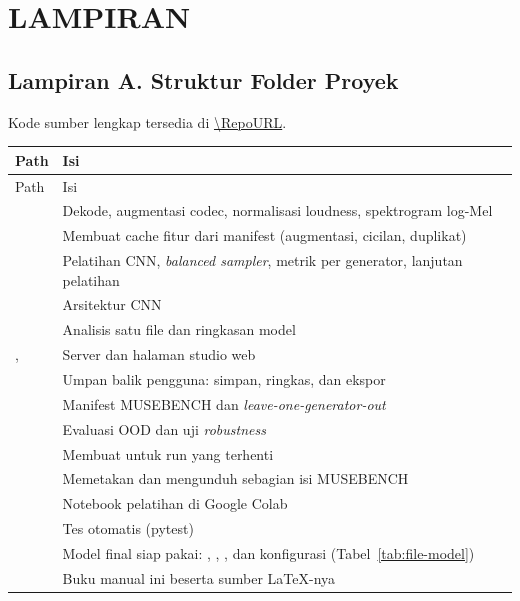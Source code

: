 \chapter*{LAMPIRAN}

\section*{Lampiran A. Struktur Folder Proyek}
Kode sumber lengkap tersedia di \url{\RepoURL}.

{\singlespacing\small
\begin{longtable}{L{5.3cm} L{7.0cm}}
\toprule
Path & Isi\\
\midrule
\endfirsthead
\toprule
Path & Isi\\
\midrule
\endhead
\bottomrule
\endfoot
{} & Dekode, augmentasi codec, normalisasi loudness, spektrogram log-Mel\\
 & Membuat cache fitur dari manifest (augmentasi, cicilan, duplikat)\\
 & Pelatihan CNN, \textit{balanced sampler}, metrik per generator, lanjutan pelatihan\\
 & Arsitektur CNN\\
 & Analisis satu file dan ringkasan model\\
,\newline {} & Server dan halaman studio web\\
 & Umpan balik pengguna: simpan, ringkas, dan ekspor\\
 & Manifest MUSEBENCH dan \textit{leave-one-generator-out}\\
 & Evaluasi OOD dan uji \textit{robustness}\\
 & Membuat  untuk run yang terhenti\\
 & Memetakan dan mengunduh sebagian isi MUSEBENCH\\
 & Notebook pelatihan di Google Colab\\
 & Tes otomatis (pytest)\\
 & Model final siap pakai: , , , dan konfigurasi (Tabel~\ref{tab:file-model})\\
 & Buku manual ini beserta sumber LaTeX-nya\\
\end{longtable}}

